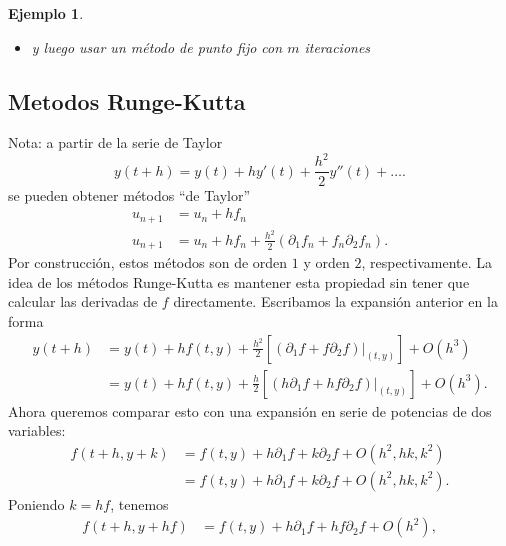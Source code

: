 \documentclass[11pt,letterpaper]{article}
\newtheorem{example}{Ejemplo}
\begin{document}
\begin{example}
\begin{itemize}
      ambos para crear una nueva
      aproximación $u_{\tilde p + 1}^{(1)}$
      
      \begin{align}
        u_{n+1}^{(0)}
        &=
        \sum_{j=0}^{\tilde p}\tilde a_j u_{n-j}^{(1)}
        + h \sum_{j=0}^{\tilde p}\tilde b_j f_{n-j}^{(0)}
      .\end{align}
      
      
    \item
      y luego usar un método de punto fijo con $m$ iteraciones
  \end{itemize}
  
\end{example}

\subsection{Metodos Runge-Kutta}
Nota: a partir de la serie de Taylor
\begin{equation}
  y(t+h) = y(t) + hy'(t) + \frac{h^{2}}{2}y''(t) + \dots
.\end{equation}
se pueden obtener métodos ``de Taylor''
\begin{align}
  u_{n+1} &= u_n + hf_n \\
  u_{n+1} &= u_n
  + hf_n
  + \frac{h^{2}}{2}(\partial_1f_n + f_n \partial_2 f_n)
.\end{align}
Por construcción, estos métodos son de orden $1$ y orden $2$,
respectivamente. La idea de los métodos Runge-Kutta es mantener esta
propiedad sin tener que calcular las derivadas de $f$ directamente.
Escribamos la expansión anterior en la forma
\begin{align}\label{eq:orig}
  y(t+h)
  &= y(t)
    + h f(t,y)
    + \frac{h^{2}}{2}
    \left[ (\partial_1 f + f \partial_2 f)|_{(t,y)} \right]
    + O(h^{3}) \\
  &= y(t)
    + h f(t,y)
    + \frac{h}{2}
    \left[ (h\partial_1 f + h f \partial_2 f)|_{(t,y)} \right]
    + O(h^{3})
.\end{align}
Ahora queremos comparar esto con una expansión en serie de potencias
de dos variables:
\begin{align}
  f(t+h,y+k)
  &=
  f(t,y) + h \partial _1 f + k \partial _2 f + O(h^{2},hk,k^{2})
  \\
  &=
  f(t,y) + h \partial _1 f + k \partial _2 f + O(h^{2},hk,k^{2}).
\end{align}
Poniendo $k=hf$, tenemos
\begin{align}
  f(t+h,y+hf)
  &=
  f(t,y) + h \partial _1 f + hf \partial _2 f
  + O(h^{2}),
\end{align}
\end{document}
